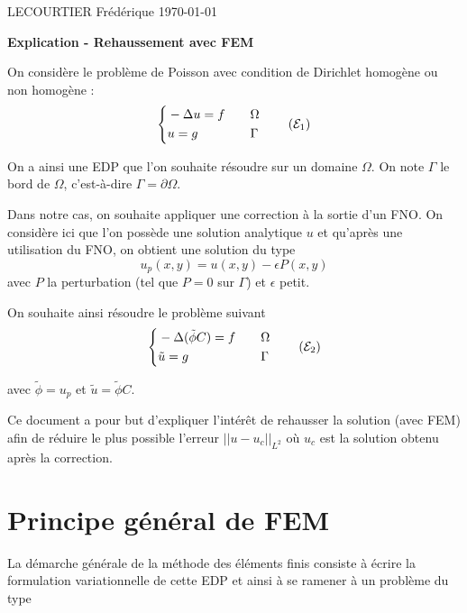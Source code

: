 \documentclass[french]{article}
\begin{document}
	LECOURTIER Frédérique \hfill \today
	\begin{center}
		\Large\textbf{{Explication - Rehaussement avec FEM}}\\
	\end{center}
	\graphicspath{{images/}}

	On considère le problème de Poisson avec condition de Dirichlet homogène ou non homogène :
	\begin{equation}
		\label{pb1}
		\left\{\begin{aligned}
			&-\Delta u=f \quad &&\Omega \\
			&u=g \quad &&\Gamma
		\end{aligned}\right. \tag{$\mathcal{E}_1$}
	\end{equation}

	On a ainsi une EDP que l'on souhaite résoudre sur un domaine $\Omega$. On note $\Gamma$ le bord de $\Omega$, c'est-à-dire $\Gamma=\partial\Omega$. 
	
	Dans notre cas, on souhaite appliquer une correction à la sortie d'un FNO.
	On considère ici que l'on possède une solution analytique $u$ et qu'après une utilisation du FNO, on obtient une solution du type
	\begin{equation}
		\label{phi_tild}
		u_p(x,y) = u(x,y)-\epsilon P(x,y)
	\end{equation}
	avec $P$ la perturbation (tel que $P=0$ sur $\Gamma$) et $\epsilon$ petit.
	
	On souhaite ainsi résoudre le problème suivant
	\begin{equation}
		\label{pb2}
		\left\{\begin{aligned}
			&-\Delta (\tilde{\phi}C)=f \quad &&\Omega \\
			&\tilde{u}=g \quad &&\Gamma
		\end{aligned}\right. \tag{$\mathcal{E}_2$}
	\end{equation}
	
	avec $\tilde{\phi}=u_p$ et $\tilde{u}=\tilde{\phi}C$.
	
	Ce document a pour but d'expliquer l'intérêt de rehausser la solution (avec FEM) afin de réduire le plus possible l'erreur $||u-u_{c}||_{L^2}$ où $u_{c}$ est la solution obtenu après la correction.
	
	\section*{Principe général de FEM}
	
	La démarche générale de la méthode des éléments finis consiste à écrire la formulation variationnelle de cette EDP et ainsi à se ramener à un problème du type
	
\end{document}

